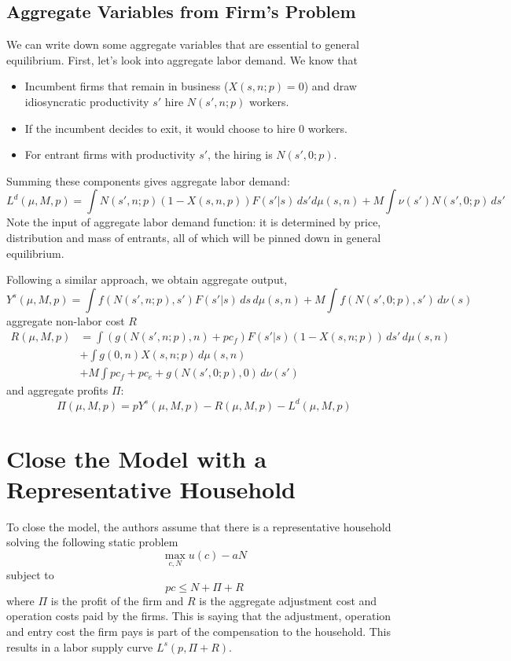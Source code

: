 \documentclass[12pt]{article}
\begin{document}
\subsection{Aggregate Variables from Firm's Problem}
We can write down some aggregate variables that are essential to general equilibrium. First, let's look into aggregate labor demand. We know that 
\begin{itemize}
		\item Incumbent firms that remain in business ($X(s,n;p) = 0$) and draw idiosyncratic productivity $s'$ hire $N(s',n;p)$ workers.
	\item If the incumbent decides to exit, it would choose to hire 0 workers. 
	\item For entrant firms with productivity $s'$, the hiring is $N(s', 0; p)$.
\end{itemize}
Summing these components gives aggregate labor demand:
\begin{equation}
	L^d(\mu, M, p) = \int N(s',n;p) (1-X(s,n,p)) F(s'|s) \, ds' d \mu(s,n) + M \int \nu(s') N(s', 0; p) \, ds'
\end{equation}
Note the input of aggregate labor demand function: it is determined by price, distribution and mass of entrants, all of which will be pinned down in general equilibrium.

Following a similar approach, we obtain aggregate output,
\begin{equation}
	Y^s(\mu, M, p) = \int f(N(s', n;p), s') F(s'|s) \, ds \, d\mu(s,n) + M \int f(N(s', 0;p), s')\, d\nu(s)
\end{equation}
aggregate non-labor cost $R$
\begin{align}
	R(\mu, M, p) & = \int \left(g(N(s', n;p), n) + p c_f\right) F(s'|s) (1-X(s,n;p)) \, ds' \, d\mu(s,n) \nonumber \\
	& + \int g(0, n) X(s,n;p) \, d\mu(s,n) \nonumber \\
	& + M \int pc_f + pc_e + g(N(s', 0; p), 0) \, d\nu(s') 
\end{align}
and aggregate profits $\Pi$:
\begin{equation}
	\Pi(\mu, M, p) = pY^s(\mu, M ,p) - R(\mu, M, p) - L^d(\mu, M, p)
\end{equation}

\section{Close the Model with a Representative Household}
To close the model, the authors assume that there is a representative household solving the following static problem
\begin{equation}
	\max_{c,N} u(c) - a N  
\end{equation}  
subject to
\begin{equation}
	pc \leq N + \Pi + R
\end{equation}
where $\Pi$ is the profit of the firm and $R$ is the aggregate adjustment cost and operation costs paid by the firms. This is saying that the adjustment, operation and entry cost the firm pays is part of the compensation to the household. This results in a labor supply curve $L^s(p, \Pi + R)$.
\end{document}
